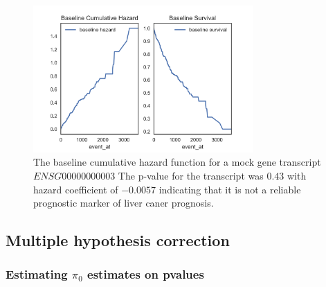 \documentclass{article}
\begin{document}
\begin{figure}[tbh]
    \centering
      \includegraphics[width=0.75\textwidth]{survial_plot_one_mock_gene.png}
    \caption{The baseline cumulative hazard function for a mock gene transcript $ENSG00000000003$   The p-value for the transcript was $0.43$ with hazard coefficient of $-0.0057$ indicating that it is not a reliable prognostic marker of liver caner prognosis.}
    \label{fig:Baseline_hazard_and_survival}
\end{figure}
  		
	\subsection { Multiple hypothesis correction }
	
	\subsubsection {Estimating $\pi_0$ estimates on pvalues}
	
\end{document}
